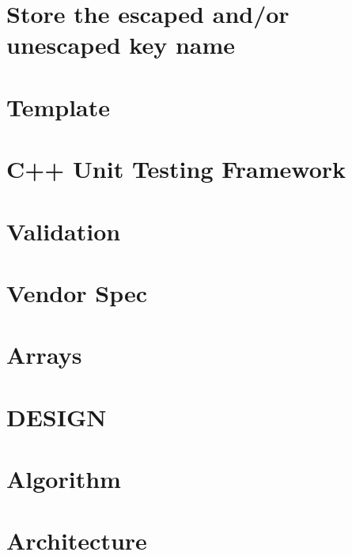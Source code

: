 \let\mypdfximage\pdfximage\def\pdfximage{\immediate\mypdfximage}\documentclass[twoside]{book}
\newcommand{\+}{\discretionary{\mbox{\scriptsize$\hookleftarrow$}}{}{}}
\begin{document}
\chapter{Store the escaped and/or unescaped key name}
\label{doc_decisions_store_name_md}

\chapter{Template}
\label{doc_decisions_template_md}

\chapter{C++ Unit Testing Framework}
\label{doc_decisions_unit_testing_md}

\chapter{Validation}
\label{doc_decisions_validation_md}

\chapter{Vendor Spec}
\label{doc_decisions_vendor_spec_md}

\chapter{Arrays}
\label{doc_decisions_warning_array_md}

\chapter{DESIGN}
\label{doc_DESIGN_md}

\chapter{Algorithm}
\label{doc_dev_algorithm_md}

\chapter{Architecture}
\label{doc_dev_architecture_md}

\end{document}
